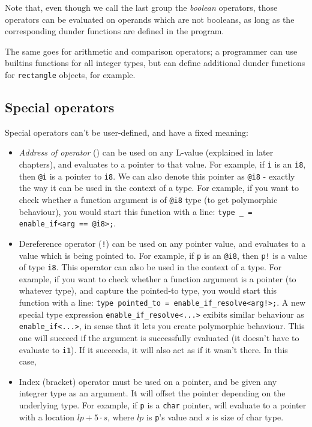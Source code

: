 \documentclass[times, utf8, diplomski]{fer}
\theoremstyle{definition}
\begin{document}
Note that, even though we call the last group the \textit{boolean} operators,
those operators can be evaluated on operands which are not booleans,
as long as the corresponding dunder functions are defined in the program.

The same goes for arithmetic and comparison operators; a programmer can use
builtins functions for all integer types, but can define additional dunder functions
for \texttt{rectangle} objects, for example.

\subsection{Special operators}

Special operators can't be user-defined, and have a fixed meaning:

\begin{itemize}
    \item \textit{Address of operator} () can be used on any L-value (explained
        in later chapters), and evaluates to a pointer to that value. For
        example, if \texttt{i} is an \texttt{i8}, then \texttt{@i} is a pointer
    to \texttt{i8}. We can also denote this pointer as \texttt{@i8} - exactly the way it can be used in 
    the context of a type. For example, if you want to check whether a function argument is of \texttt{@i8}
    type (to get polymorphic behaviour), you would start this function with a line:
    \texttt{type \_ = enable\_if<arg == @i8>;}.

    \item Dereference operator (\texttt{!}) can be used on any pointer value, 
        and evaluates to a value which is being pointed to.
        For example, if \texttt{p} is an \texttt{@i8}, then \texttt{p!} is a value of type \texttt{i8}.
    This operator can also be used in the context of a type.
    For example, if you want to check whether a function argument is a pointer (to whatever type), 
    and capture the pointed-to type, you would start this function with a line:
    \texttt{type pointed\_to = enable\_if\_resolve<arg!>;}.
    A new special type expression \texttt{enable\_if\_resolve<...>} exibits similar behaviour as
    \texttt{enable\_if<...>}, in sense that it lets you create polymorphic behaviour. This one will
    succeed if the argument is successfully evaluated (it doesn't have to evaluate to \texttt{i1}).
    If it succeeds, it will also act as if it wasn't there. In this case, 


    \item Index (bracket) operator must be used on a pointer, and be given any integrer type as an argument.
        It will offset the pointer depending on the underlying type. For example, 
        if \texttt{p} is a \texttt{char} pointer,  will evaluate to a pointer 
        with a location $lp+5\cdot s$, where $lp$ is \texttt{p}'s value and $s$ is size of char type.
\end{itemize}
\end{document}
